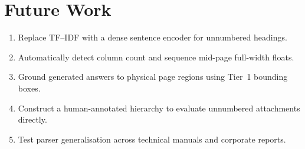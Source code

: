 \documentclass[12pt,a4paper,twoside,openright]{report}
\begin{document}
\section{Future Work}
\begin{enumerate}\setlength{\itemsep}{1pt}\setlength{\parskip}{0pt}\setlength{\parsep}{0pt}
  \item Replace TF--IDF with a dense sentence encoder for unnumbered headings.
  \item Automatically detect column count and sequence mid-page full-width floats.
  \item Ground generated answers to physical page regions using Tier~1 bounding boxes.
  \item Construct a human-annotated hierarchy to evaluate unnumbered attachments directly.
  \item Test parser generalisation across technical manuals and corporate reports.
\end{enumerate}
\end{document}
